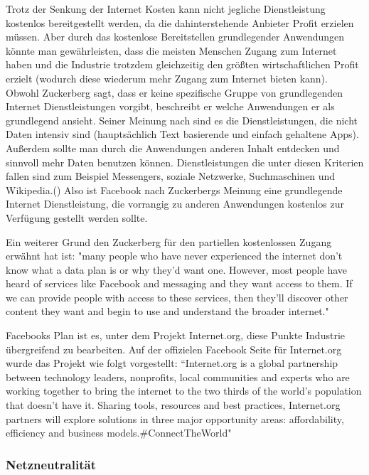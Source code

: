 \documentclass{article}
\begin{document}
\medskip
Trotz der Senkung der Internet Kosten kann nicht jegliche Dienstleistung kostenlos bereitgestellt werden, da die dahinterstehende Anbieter Profit erzielen müssen. 
Aber durch das kostenlose Bereitstellen grundlegender Anwendungen könnte man gewährleisten, dass die meisten Menschen Zugang zum Internet haben und die Industrie trotzdem gleichzeitig den größten wirtschaftlichen Profit erzielt (wodurch diese wiederum mehr Zugang zum Internet bieten kann).
Obwohl Zuckerberg sagt, dass er keine spezifische Gruppe von grundlegenden Internet Dienstleistungen vorgibt, beschreibt er welche Anwendungen er als grundlegend ansieht.
Seiner Meinung nach sind es die Dienstleistungen, die nicht Daten intensiv sind (hauptsächlich Text basierende und einfach gehaltene Apps). 
Außerdem sollte man durch die Anwendungen anderen Inhalt entdecken und sinnvoll mehr Daten benutzen können.
Dienstleistungen die unter diesen Kriterien fallen sind zum Beispiel Messengers, soziale Netzwerke, Suchmaschinen und Wikipedia.(\cite[5]{HumanRight})
Also ist Facebook nach Zuckerbergs Meinung eine grundlegende Internet Dienstleistung, die vorrangig zu anderen Anwendungen kostenlos zur Verfügung gestellt werden sollte.

\medskip

Ein weiterer Grund den Zuckerberg für den partiellen kostenlossen Zugang erwähnt hat ist:
"many people who have never experienced the internet don’t know what a data plan is or why they’d want one. 
However, most people have heard of services like Facebook and messaging and they want access to them. If we can provide people 
with access to these services, then they’ll discover other content they want and begin to use 
and understand the broader internet." \parencite[4]{HumanRight}

\medskip

Facebooks Plan ist es, unter dem Projekt Internet.org, diese Punkte Industrie übergreifend zu bearbeiten.
Auf der offizielen Facebook Seite für Internet.org wurde das Projekt wie folgt vorgestellt:
``Internet.org is a global partnership between technology leaders, nonprofits, local communities and experts who are working together to bring the internet to the two thirds of the world's population that doesn't have it. Sharing tools, resources and best practices, Internet.org partners will explore solutions in three major opportunity areas: affordability, efficiency and business models.\#ConnectTheWorld" \parencite{InternetOrg}


\subsubsection{Netzneutralität}
\end{document}
